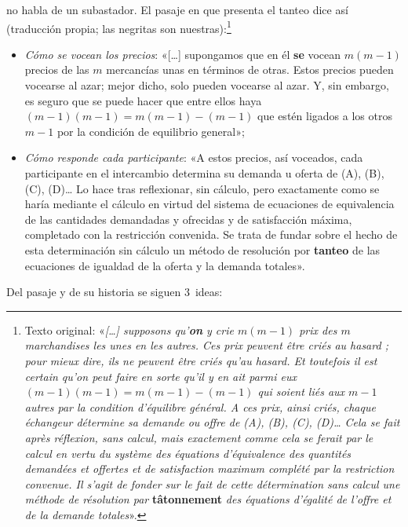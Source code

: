 \documentclass[11pt]{article}
\begin{document}
 no habla de un subastador. El pasaje en que presenta el tanteo dice así (traducción propia; las negritas son nuestras):\footnote{Texto original: «\emph{[\ldots] supposons qu'\textbf{on} y crie $m(m-1)$ prix des $m$ marchandises les unes en les autres. Ces prix peuvent être criés au hasard ; pour mieux dire, ils ne peuvent être criés qu'au hasard. Et toutefois il est certain qu'on peut faire en sorte qu'il y en ait parmi eux $(m-1)(m-1)=m(m-1)-(m-1)$ qui soient liés aux $m-1$ autres par la condition d'équilibre général. A ces prix, ainsi criés, chaque échangeur détermine sa demande ou offre de (A), (B), (C), (D)\ldots{} Cela se fait après réflexion, sans calcul, mais exactement comme cela se ferait par le calcul en vertu du système des équations d'équivalence des quantités demandées et offertes et de satisfaction maximum complété par la restriction convenue. Il s'agit de fonder sur le fait de cette détermination sans calcul une méthode de résolution par} \textbf{tâtonnement} \emph{des équations d'égalité de l'offre et de la demande totales}»\nocite{Walras1874Elements}.}
\begin{itemize}
\item \emph{Cómo se vocean los precios}: «[\ldots] supongamos que en él \textbf{se} vocean $m(m-1)$ precios de las $m$ mercancías unas en términos de otras. Estos precios pueden vocearse al azar; mejor dicho, solo pueden vocearse al azar. Y, sin embargo, es seguro que se puede hacer que entre ellos haya $(m-1)(m-1)=m(m-1)-(m-1)$ que estén ligados a los otros $m-1$ por la condición de equilibrio general»;
\item \emph{Cómo responde cada participante}: «A estos precios, así voceados, cada participante en el intercambio determina su demanda u oferta de (A), (B), (C), (D)\ldots{} Lo hace tras reflexionar, sin cálculo, pero exactamente como se haría mediante el cálculo en virtud del sistema de ecuaciones de equivalencia de las cantidades demandadas y ofrecidas y de satisfacción máxima, completado con la restricción convenida. Se trata de fundar sobre el hecho de esta determinación sin cálculo un método de resolución por \textbf{tanteo} de las ecuaciones de igualdad de la oferta y la demanda totales».
\end{itemize}
Del pasaje y de su historia se siguen 3~ideas:
\end{document}
